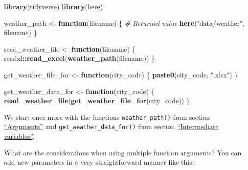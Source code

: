 \documentclass[]{book}
\newenvironment{Shaded}{\begin{snugshade}}{\end{snugshade}}
\newcommand{\CommentTok}[1]{\textcolor[rgb]{0.56,0.35,0.01}{\textit{#1}}}
\newcommand{\ControlFlowTok}[1]{\textcolor[rgb]{0.13,0.29,0.53}{\textbf{#1}}}
\newcommand{\KeywordTok}[1]{\textcolor[rgb]{0.13,0.29,0.53}{\textbf{#1}}}
\newcommand{\NormalTok}[1]{#1}
\newcommand{\OperatorTok}[1]{\textcolor[rgb]{0.81,0.36,0.00}{\textbf{#1}}}
\newcommand{\StringTok}[1]{\textcolor[rgb]{0.31,0.60,0.02}{#1}}
\begin{document}
\begin{Shaded}
\begin{Highlighting}[]
\KeywordTok{library}\NormalTok{(tidyverse)}
\KeywordTok{library}\NormalTok{(here)}


\NormalTok{weather_path <-}\StringTok{ }\ControlFlowTok{function}\NormalTok{(filename) \{}
  \CommentTok{# Returned value}
  \KeywordTok{here}\NormalTok{(}\StringTok{"data/weather"}\NormalTok{, filename)}
\NormalTok{\}}

\NormalTok{read_weather_file <-}\StringTok{ }\ControlFlowTok{function}\NormalTok{(filename) \{}
\NormalTok{  readxl}\OperatorTok{::}\KeywordTok{read_excel}\NormalTok{(}\KeywordTok{weather_path}\NormalTok{(filename))}
\NormalTok{\}}

\NormalTok{get_weather_file_for <-}\StringTok{ }\ControlFlowTok{function}\NormalTok{(city_code) \{}
  \KeywordTok{paste0}\NormalTok{(city_code, }\StringTok{".xlsx"}\NormalTok{)}
\NormalTok{\}}

\NormalTok{get_weather_data_for <-}\StringTok{ }\ControlFlowTok{function}\NormalTok{(city_code) \{}
  \KeywordTok{read_weather_file}\NormalTok{(}\KeywordTok{get_weather_file_for}\NormalTok{(city_code))}
\NormalTok{\}}
\end{Highlighting}
\end{Shaded}

We start once more with the functions \texttt{weather\_path()} from section \protect\hyperlink{args}{``Arguments''} and \texttt{get\_weather\_data\_for()} from section \protect\hyperlink{intermediate}{``Intermediate variables''}.

What are the considerations when using multiple function arguments?
You can add new parameters in a very straightforward manner like this:
\end{document}
